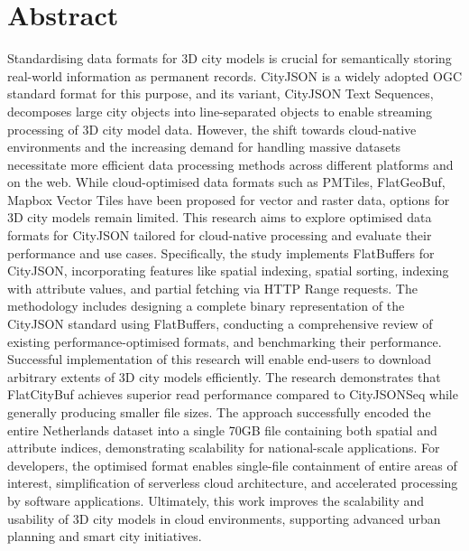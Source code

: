 
\chapter*{Abstract}
Standardising data formats for 3D city models is crucial for semantically storing real-world information as permanent records.
CityJSON is a widely adopted OGC standard format for this purpose, and its variant, CityJSON Text Sequences, decomposes large city objects into line-separated objects to enable streaming processing of 3D city model data.
However, the shift towards cloud-native environments and the increasing demand for handling massive datasets necessitate more efficient data processing methods across different platforms and on the web.
While cloud-optimised data formats such as PMTiles, FlatGeoBuf, Mapbox Vector Tiles have been proposed for vector and raster data, options for 3D city models remain limited.
This research aims to explore optimised data formats for CityJSON tailored for cloud-native processing and evaluate their performance and use cases.
Specifically, the study implements FlatBuffers for CityJSON, incorporating features like spatial indexing, spatial sorting, indexing with attribute values, and partial fetching via HTTP Range requests.
The methodology includes designing a complete binary representation of the CityJSON standard using FlatBuffers, conducting a comprehensive review of existing performance-optimised formats, and benchmarking their performance.
Successful implementation of this research will enable end-users to download arbitrary extents of 3D city models efficiently.
The research demonstrates that FlatCityBuf achieves superior read performance compared to CityJSONSeq while generally producing smaller file sizes.
The approach successfully encoded the entire Netherlands dataset into a single 70GB file containing both spatial and attribute indices, demonstrating scalability for national-scale applications.
For developers, the optimised format enables single-file containment of entire areas of interest, simplification of serverless cloud architecture, and accelerated processing by software applications.
Ultimately, this work improves the scalability and usability of 3D city models in cloud environments, supporting advanced urban planning and smart city initiatives.